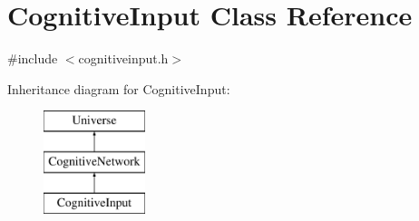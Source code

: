 \hypertarget{classCognitiveInput}{}\section{Cognitive\+Input Class Reference}
\label{classCognitiveInput}


{\ttfamily \#include $<$cognitiveinput.\+h$>$}

Inheritance diagram for Cognitive\+Input\+:\begin{figure}[H]
\begin{center}
\leavevmode
\includegraphics[height=3.000000cm]{classCognitiveInput}
\end{center}
\end{figure}
